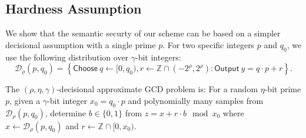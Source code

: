 \documentclass{llncs}
\newcommand{\Z}{{\mathbb Z}}
\newcommand*\Choose{\ensuremath{\mathsf{Choose}\ }}
\newcommand*\Output{\ensuremath{\mathsf{Output}\ }}
\newcommand*\D{\ensuremath{\mathcal D}}
\begin{document}
\subsection{Hardness Assumption}\label{decisional_assumption}

We show that the semantic securty of our scheme can be based on a
simpler decisional assumption with a single prime $p$. 
 For two specific
integers $p$ and $q_0$, we use the following distribution over
$\gamma$-bit integers:  
\[ \D_\rho(p,q_0) = \left\{ \Choose q\gets [0, q_0),
  r\gets \Z\cap (-2^\rho, 2^\rho) : \Output y=q\cdot p+r
  \right\}. \] 

\begin{definition}
\label{def:dagcd}
The $(\rho,\eta,\gamma)$-decisional approximate GCD problem is: For a random $\eta$-bit prime $p$, given a $\gamma$-bit integer  $x_0=q_0\cdot p$ and polynomially many samples from $\D_{\rho}(p,q_0)$,
determine $b\in\{0,1\}$ from $z=x+r\cdot b\mod x_0$ where $x\gets\D_{\rho}(p,q_0)$ and $r\gets\Z\cap[0,x_0)$.
\end{definition}
\end{document}
